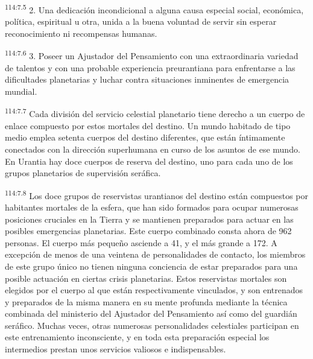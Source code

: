 \documentclass[twoside, 11pt]{book}
\begin{document}
\par
\textsuperscript{114:7.5} 2. Una dedicación incondicional a alguna causa especial social, económica, política, espiritual u otra, unida a la buena voluntad de servir sin esperar reconocimiento ni recompensas humanas.

\par
\textsuperscript{114:7.6} 3. Poseer un Ajustador del Pensamiento con una extraordinaria variedad de talentos y con una probable experiencia preurantiana para enfrentarse a las dificultades planetarias y luchar contra situaciones inminentes de emergencia mundial.

\par
\textsuperscript{114:7.7} Cada división del servicio celestial planetario tiene derecho a un cuerpo de enlace compuesto por estos mortales del destino. Un mundo habitado de tipo medio emplea setenta cuerpos del destino diferentes, que están íntimamente conectados con la dirección superhumana en curso de los asuntos de ese mundo. En Urantia hay doce cuerpos de reserva del destino, uno para cada uno de los grupos planetarios de supervisión seráfica.

\par
\textsuperscript{114:7.8} Los doce grupos de reservistas urantianos del destino están compuestos por habitantes mortales de la esfera, que han sido formados para ocupar numerosas posiciones cruciales en la Tierra y se mantienen preparados para actuar en las posibles emergencias planetarias. Este cuerpo combinado consta ahora de 962 personas. El cuerpo más pequeño asciende a 41, y el más grande a 172. A excepción de menos de una veintena de personalidades de contacto, los miembros de este grupo único no tienen ninguna conciencia de estar preparados para una posible actuación en ciertas crisis planetarias. Estos reservistas mortales son elegidos por el cuerpo al que están respectivamente vinculados, y son entrenados y preparados de la misma manera en su mente profunda mediante la técnica combinada del ministerio del Ajustador del Pensamiento así como del guardián seráfico. Muchas veces, otras numerosas personalidades celestiales participan en este entrenamiento inconsciente, y en toda esta preparación especial los intermedios prestan unos servicios valiosos e indispensables.
\end{document}
